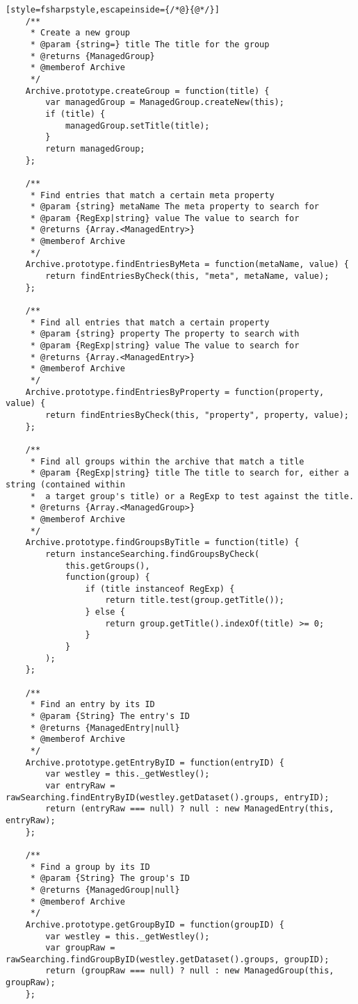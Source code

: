 \begin{lstlisting}[style=fsharpstyle,escapeinside={/*@}{@*/}]
    /**
     * Create a new group
     * @param {string=} title The title for the group
     * @returns {ManagedGroup}
     * @memberof Archive
     */
    Archive.prototype.createGroup = function(title) {
        var managedGroup = ManagedGroup.createNew(this);
        if (title) {
            managedGroup.setTitle(title);
        }
        return managedGroup;
    };

    /**
     * Find entries that match a certain meta property
     * @param {string} metaName The meta property to search for
     * @param {RegExp|string} value The value to search for
     * @returns {Array.<ManagedEntry>}
     * @memberof Archive
     */
    Archive.prototype.findEntriesByMeta = function(metaName, value) {
        return findEntriesByCheck(this, "meta", metaName, value);
    };

    /**
     * Find all entries that match a certain property
     * @param {string} property The property to search with
     * @param {RegExp|string} value The value to search for
     * @returns {Array.<ManagedEntry>}
     * @memberof Archive
     */
    Archive.prototype.findEntriesByProperty = function(property, value) {
        return findEntriesByCheck(this, "property", property, value);
    };

    /**
     * Find all groups within the archive that match a title
     * @param {RegExp|string} title The title to search for, either a string (contained within
     *  a target group's title) or a RegExp to test against the title.
     * @returns {Array.<ManagedGroup>}
     * @memberof Archive
     */
    Archive.prototype.findGroupsByTitle = function(title) {
        return instanceSearching.findGroupsByCheck(
            this.getGroups(),
            function(group) {
                if (title instanceof RegExp) {
                    return title.test(group.getTitle());
                } else {
                    return group.getTitle().indexOf(title) >= 0;
                }
            }
        );
    };

    /**
     * Find an entry by its ID
     * @param {String} The entry's ID
     * @returns {ManagedEntry|null}
     * @memberof Archive
     */
    Archive.prototype.getEntryByID = function(entryID) {
        var westley = this._getWestley();
        var entryRaw = rawSearching.findEntryByID(westley.getDataset().groups, entryID);
        return (entryRaw === null) ? null : new ManagedEntry(this, entryRaw);
    };

    /**
     * Find a group by its ID
     * @param {String} The group's ID
     * @returns {ManagedGroup|null}
     * @memberof Archive
     */
    Archive.prototype.getGroupByID = function(groupID) {
        var westley = this._getWestley();
        var groupRaw = rawSearching.findGroupByID(westley.getDataset().groups, groupID);
        return (groupRaw === null) ? null : new ManagedGroup(this, groupRaw);
    };


\end{lstlisting}
